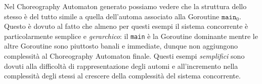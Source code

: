 Nel Choreography Automaton generato possiamo vedere che la struttura dello stesso è del tutto simile a quella dell'automa associato alla Goroutine $\texttt{main}_0$. Questo è dovuto al fatto che almeno per questi esempi il sistema concorrente è particolarmente semplice e \emph{gerarchico}: il \texttt{main} è la Goroutine dominante mentre le altre Goroutine sono piuttosto banali e immediate, dunque non aggiungono complessità al Choreography Automaton finale. Questi esempi \emph{semplifici} sono dovuti alla difficoltà di rappresentazione degli automi e all'incremento nella complessità degli stessi al crescere della complessità del sistema concorrente.
\begin{figure}[h!]
    \centering
\end{figure}


